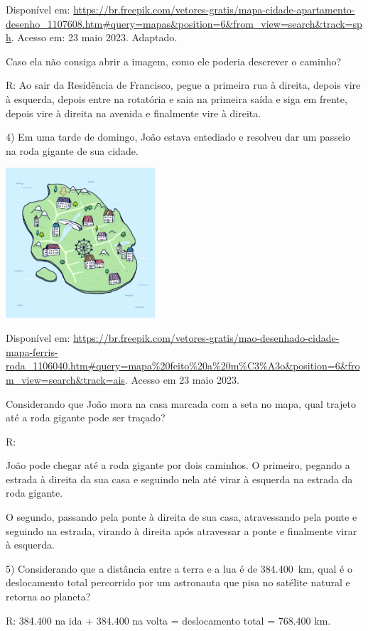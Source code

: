 Disponível em:
\url{https://br.freepik.com/vetores-gratis/mapa-cidade-apartamento-desenho_1107608.htm\#query=mapas\&position=6\&from_view=search\&track=sph}.
Acesso em: 23 maio 2023. Adaptado.

Caso ela não consiga abrir a imagem, como ele poderia descrever o
caminho?

R: Ao sair da Residência de Francisco, pegue a primeira rua à direita,
depois vire à esquerda, depois entre na rotatória e saia na primeira
saída e siga em frente, depois vire à direita na avenida e finalmente
vire à direita.

4) Em uma tarde de domingo, João estava entediado e resolveu dar um
passeio na roda gigante de sua cidade.

\includegraphics[width=2.2in,height=2.2in]{./imgSAEB_8_MAT/media/image38.png}

Disponível em:
\url{https://br.freepik.com/vetores-gratis/mao-desenhado-cidade-mapa-ferris-roda_1106040.htm\#query=mapa\%20feito\%20a\%20m\%C3\%A3o\&position=6\&from_view=search\&track=ais}.
Acesso em 23 maio 2023.

Considerando que João mora na casa marcada com a seta no mapa, qual
trajeto até a roda gigante pode ser traçado?

R:

João pode chegar até a roda gigante por dois caminhos. O primeiro,
pegando a estrada à direita da sua casa e seguindo nela até virar à
esquerda na estrada da roda gigante.

O segundo, passando pela ponte à direita de sua casa, atravessando pela
ponte e seguindo na estrada, virando à direita após atravessar a ponte e
finalmente virar à esquerda.

5) Considerando que a distância entre a terra e a lua é de 384.400~km,
qual é o deslocamento total percorrido por um astronauta que pisa no
satélite natural e retorna ao planeta?

R: 384.400 na ida + 384.400 na volta = deslocamento total = 768.400 km.

